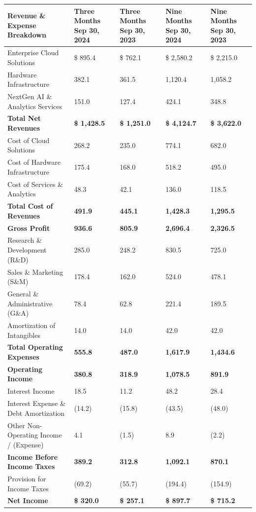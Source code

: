 \documentclass[10pt,a4paper]{article}
\begin{document}
\vspace{-2pt}
\begin{tabularx}{\textwidth}{K M M M M}
\toprule
{}
\color{white}\bfseries Revenue \& Expense Breakdown & 
\color{white}\bfseries Three Months Sep 30, 2024 & 
\color{white}\bfseries Three Months Sep 30, 2023 & 
\color{white}\bfseries Nine Months Sep 30, 2024 & 
\color{white}\bfseries Nine Months Sep 30, 2023 \\
\midrule
Enterprise Cloud Solutions & \$ 895.4 & \$ 762.1 & \$ 2,580.2 & \$ 2,215.0 \\{}
Hardware Infrastructure & 382.1 & 361.5 & 1,120.4 & 1,058.2 \\{}
NextGen AI \& Analytics Services & 151.0 & 127.4 & 424.1 & 348.8 \\
\midrule
\textbf{Total Net Revenues} & \textbf{\$ 1,428.5} & \textbf{\$ 1,251.0} & \textbf{\$ 4,124.7} & \textbf{\$ 3,622.0} \\
\midrule
Cost of Cloud Solutions & 268.2 & 235.0 & 774.1 & 682.0 \\{}
Cost of Hardware Infrastructure & 175.4 & 168.0 & 518.2 & 495.0 \\{}
Cost of Services \& Analytics & 48.3 & 42.1 & 136.0 & 118.5 \\
\midrule
\textbf{Total Cost of Revenues} & \textbf{491.9} & \textbf{445.1} & \textbf{1,428.3} & \textbf{1,295.5} \\
\midrule
\textbf{Gross Profit} & \textbf{936.6} & \textbf{805.9} & \textbf{2,696.4} & \textbf{2,326.5} \\
\midrule
Research \& Development (R\&D) & 285.0 & 248.2 & 830.5 & 725.0 \\{}
Sales \& Marketing (S\&M) & 178.4 & 162.0 & 524.0 & 478.1 \\{}
General \& Administrative (G\&A) & 78.4 & 62.8 & 221.4 & 189.5 \\{}
Amortization of Intangibles & 14.0 & 14.0 & 42.0 & 42.0 \\
\midrule
\textbf{Total Operating Expenses} & \textbf{555.8} & \textbf{487.0} & \textbf{1,617.9} & \textbf{1,434.6} \\
\midrule
\textbf{Operating Income} & \textbf{380.8} & \textbf{318.9} & \textbf{1,078.5} & \textbf{891.9} \\
\midrule
Interest Income & 18.5 & 11.2 & 48.2 & 28.4 \\{}
Interest Expense \& Debt Amortization & (14.2) & (15.8) & (43.5) & (48.0) \\{}
Other Non-Operating Income / (Expense) & 4.1 & (1.5) & 8.9 & (2.2) \\
\midrule
\textbf{Income Before Income Taxes} & \textbf{389.2} & \textbf{312.8} & \textbf{1,092.1} & \textbf{870.1} \\{}
Provision for Income Taxes & (69.2) & (55.7) & (194.4) & (154.9) \\
\midrule
\textbf{Net Income} & \textbf{\$ 320.0} & \textbf{\$ 257.1} & \textbf{\$ 897.7} & \textbf{\$ 715.2} \\
\bottomrule
\end{tabularx}
\end{document}
